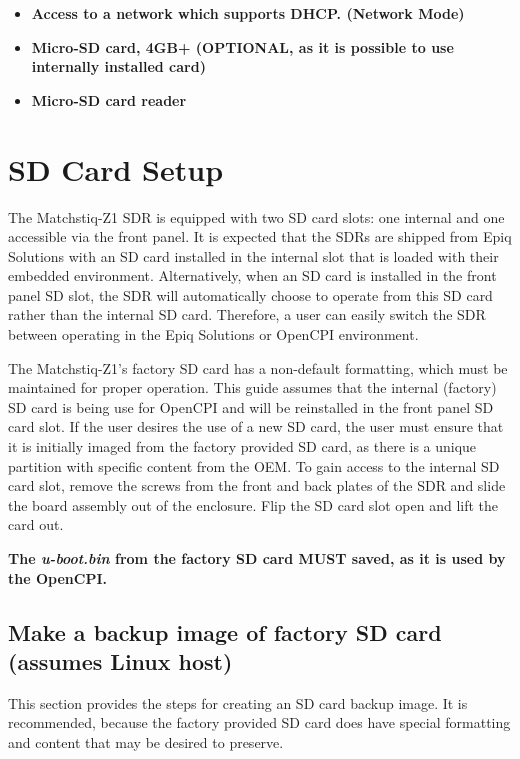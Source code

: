 \begin{flushleft}
\begin{itemize}
\item \textbf{Access to a network which supports DHCP. (Network Mode)}
\item \textbf{Micro-SD card, 4GB+ (OPTIONAL, as it is possible to use internally installed card) }
\item \textbf{Micro-SD card reader}
\end{itemize}
\end{flushleft}

\newpage
\section{SD Card Setup}
\label{sec:SD_Card_Setup}
The Matchstiq-Z1 SDR is equipped with two SD card slots: one internal and one accessible via the front panel. It is expected that the SDRs are shipped from Epiq Solutions with an SD card installed in the internal slot that is loaded with their embedded environment. Alternatively, when an SD card is installed in the front panel SD slot, the SDR will automatically choose to operate from this SD card rather than the internal SD card. Therefore, a user can easily switch the SDR between operating in the Epiq Solutions or OpenCPI environment.

The Matchstiq-Z1's factory SD card has a non-default formatting, which must be maintained for proper operation. This guide assumes that the internal (factory) SD card is being use for OpenCPI and will be reinstalled in the front panel SD card slot. If the user desires the use of a new SD card, the user must ensure that it is initially imaged from the factory provided SD card, as there is a unique partition with specific content from the OEM. To gain access to the internal SD card slot, remove the screws from the front and back plates of the SDR and slide the board assembly out of the enclosure. Flip the SD card slot open and lift the card out.

\textbf{The \textit{u-boot.bin} from the factory SD card MUST saved, as it is used by the OpenCPI.}

\subsection{Make a backup image of factory SD card (assumes Linux host)}
This section provides the steps for creating an SD card backup image. It is recommended, because the factory provided SD card does have special formatting and content that may be desired to preserve.

